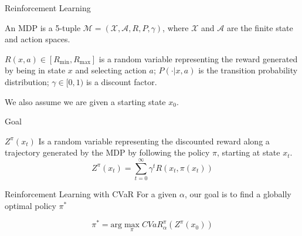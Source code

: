 \documentclass{beamer}
\begin{document}
\begin{frame}{Reinforcement Learning}

\begin{definition}
An MDP is a 5-tuple $\mathcal{M} = (\mathcal{X}, \mathcal{A}, R, P, \gamma)$, where $\mathcal{X}$ and $\mathcal{A}$ are the finite state and action spaces.

$R(x, a) \in [R_{\min}, R_{\max}]$ is a random variable representing the reward generated by being in state $x$ and selecting action $a$; $P(\cdot|x, a)$ is the transition probability distribution;
$\gamma \in [0, 1)$ is a discount factor. 

We also assume we are given a starting state $x_0$.
\end{definition}
\end{frame}


\begin{frame}{Goal}

\begin{definition}
$Z^\pi(x_t)$ Is a random variable representing the discounted reward along a trajectory generated by the MDP by following the policy $\pi$, starting at state $x_t$.
$$Z^\pi(x_{t})=\sum_{t=0}^\infty \gamma^tR(x_t,\pi(x_t))$$
\end{definition}

\begin{block}{Reinforcement Learning with CVaR}
For a given $\alpha$, our goal is to find a globally optimal policy $\pi^*$

$$\pi^* = \text{arg}\max_\pi CVaR^\pi_\alpha(Z^\pi(x_0))$$
\end{block}
\end{frame}

\end{document}
